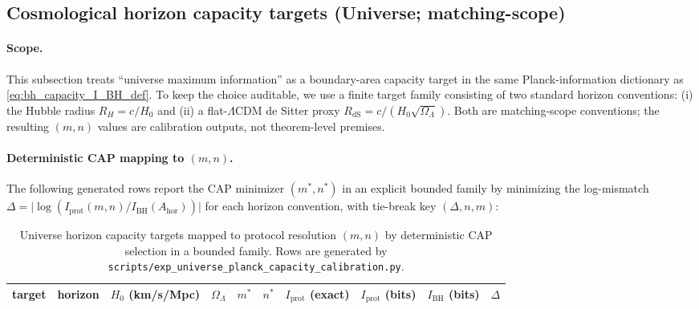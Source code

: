 %

%

\subsection{Cosmological horizon capacity targets (Universe; matching-scope)}
\label{subsec:universe_planck_capacity_targets}

\paragraph{Scope.}
\MatchTag This subsection treats ``universe maximum information'' as a boundary-area capacity target in the same Planck-information dictionary as \eqref{eq:bh_capacity_I_BH_def}.
To keep the choice auditable, we use a finite target family consisting of two standard horizon conventions:
(i) the Hubble radius $R_H=c/H_0$ and (ii) a flat-$\Lambda$CDM de Sitter proxy $R_{\mathrm{dS}}=c/(H_0\sqrt{\Omega_\Lambda})$.
Both are matching-scope conventions; the resulting $(m,n)$ values are calibration outputs, not theorem-level premises.

\paragraph{Deterministic CAP mapping to $(m,n)$.}
\AuditTag The following generated rows report the CAP minimizer $(m^\ast,n^\ast)$ in an explicit bounded family by minimizing the log-mismatch
$\Delta=\bigl|\log(I_{\mathrm{prot}}(m,n)/I_{\mathrm{BH}}(A_{\mathrm{hor}}))\bigr|$
for each horizon convention, with tie-break key $(\Delta,n,m)$:
\begin{table}[t]
\centering
\scriptsize
\setlength{\tabcolsep}{5pt}
\renewcommand{\arraystretch}{1.15}
\begin{tabular}{l l r r r r l r r r}
\toprule
target & horizon & $H_0$ (km/s/Mpc) & $\Omega_\Lambda$ & $m^\ast$ & $n^\ast$ & $I_{\mathrm{prot}}$ (exact) & $I_{\mathrm{prot}}$ (bits) & $I_{\mathrm{BH}}$ (bits) & $\Delta$ \\
\midrule
%
\end{tabular}
\caption{Universe horizon capacity targets mapped to protocol resolution $(m,n)$ by deterministic CAP selection in a bounded family. Rows are generated by \texttt{scripts/exp\_universe\_planck\_capacity\_calibration.py}.}
\label{tab:universe_planck_capacity_targets}
\end{table}
%

